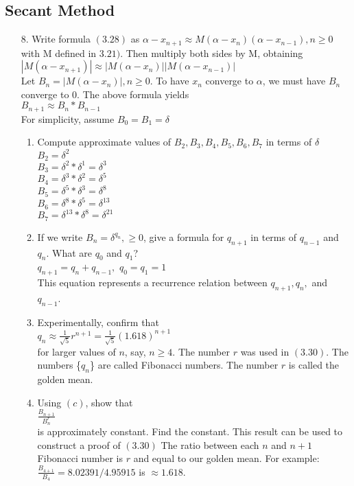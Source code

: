 \documentclass[12pt,letterpaper]{article}
\begin{document}
\subsection{Secant Method} 
	\begin{enumerate} 
		\item[8.] Write formula $(3.28)$ as $\alpha - x_{n+1} \approx M(\alpha - x_{n})(\alpha - x_{n-1}), n \geq 0$ \\
		with M defined in $3.21)$. Then multiply both sides by M, obtaining \\
		$| M(\alpha - x_{n+1}) | \approx | M(\alpha - x_{n}) | | M(\alpha - x_{n-1})|$ \\
		Let $B_{n} = | M(\alpha - x_{n}) |, n \geq 0$. To have $x_{n}$ converge to $\alpha$, we must have $B_{n}$ converge to 0. The above formula yields \\
		$B_{n+1} \approx B_{n}*B_{n-1}$ \\
		For simplicity, assume $B_{0} = B_{1} = \delta$ \\
		\begin{enumerate}
			\item Compute approximate values of $B_{2}, B_{3}, B_{4}, B_{5}, B_{6}, B_{7}$ in terms of $\delta$ \\
			$B_{2} = \delta^{2}$ \\
			$B_{3} = \delta^{2}*\delta^{1} = \delta^{3}$ \\
			$B_{4} = \delta^{3}*\delta^{2} = \delta^{5}$ \\
			$B_{5} = \delta^{5}*\delta^{3} = \delta^{8}$ \\
			$B_{6} = \delta^{8}*\delta^{5} = \delta^{13}$ \\
			$B_{7} = \delta^{13}*\delta^{8} = \delta^{21}$ \\
			
		\item If we write $B_{n} = \delta^{q_{n}}, \geq 0$, give a formula for $q_{n+1}$ in terms of $q_{n-1}$ and $q_{n}$. What are $q_{0}$ and $q_{1}$? \\
			$q_{n+1} = q_{n} + q_{n-1},$    $q_{0} = q_{1} = 1$ \\
			This equation represents a recurrence relation between $q_{n+1}, q_{n},$ and $q_{n-1}$. \\
			\item Experimentally, confirm that \\
			$q_{n} \approx \frac{1}{\sqrt{5}}r^{n+1} = \frac{1}{\sqrt{5}}(1.618)^{n+1}$ \\
			for larger values of $n$, say, $n \geq 4$. The number $r$ was used in $(3.30)$. The numbers \{$q_{n}$\} are called Fibonacci numbers. The number $r$ is called the golden mean.
			\item Using $(c)$, show that \\
			$\frac{B_{n+1}}{B_{n}^{r}}$ \\
			is approximately constant. Find the constant. This result can be used to construct a proof of $(3.30)$ 
			The ratio between each $n$ and $n+1$ Fibonacci number is $r$ and equal to our golden mean. For example: \\
			$\frac{B_{4+1}}{B_{4}} = 8.02391/4.95915 $ is $\approx 1.618$. 
		\end{enumerate} 
	\end{enumerate} 
\end{document}

